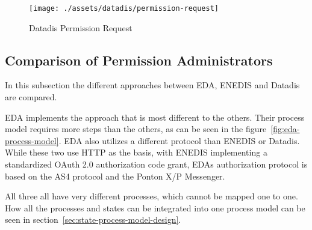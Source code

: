 \begin{figure}[h]
    \texttt{[image: ./assets/datadis/permission-request]}
    \caption{Datadis Permission Request}
    \label{fig:datadis-permission-request}
\end{figure}

\subsection{Comparison of Permission Administrators}\label{subsec:comparison-of-permission-administrators}
In this subsection the different approaches between EDA, ENEDIS and Datadis are compared.

EDA implements the approach that is most different to the others.
Their process model requires more steps than the others, as can be seen in the figure\ \ref{fig:eda-process-model}.
EDA also utilizes a different protocol than ENEDIS or Datadis.
While these two use HTTP as the basis, with ENEDIS implementing a standardized OAuth 2.0 authorization code grant, EDAs authorization protocol is based on the AS4 protocol and the Ponton X/P Messenger.

All three all have very different processes, which cannot be mapped one to one.
How all the processes and states can be integrated into one process model can be seen in section\ \ref{sec:state-process-model-design}.
